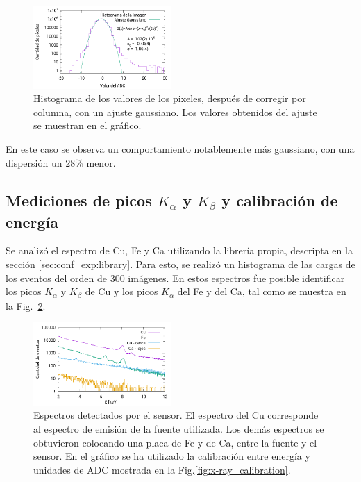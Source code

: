 \documentclass[twoside,twocolumn]{article}
\begin{document}
      \begin{figure}[h!]
        \includegraphics[width=0.47\textwidth]{figures/background_histo_subs.pdf}
        \caption{Histograma de los valores de los pixeles, después de corregir por columna,
        con un ajuste gaussiano.
        Los valores obtenidos del ajuste se muestran en el gráfico.}
        \label{fig:histogram_subs}
      \end{figure}

      En este caso se observa un comportamiento notablemente más gaussiano, con una dispersión un $28\%$ menor.

    \subsection{Mediciones de picos $K_{\alpha}$ y $K_{\beta}$ y calibración de energía}\label{sec:results:peaks}
      Se analizó el espectro de Cu, Fe y Ca utilizando la librería propia, descripta en la sección \ref{sec:conf_exp:library}.
      Para esto, se realizó un histograma de las cargas de los eventos del orden de 300 imágenes.
      En estos espectros fue posible identificar los picos $K_{\alpha}$ y $K_{\beta}$ de Cu y los picos $K_{\alpha}$ del Fe y del Ca,
      tal como se muestra en la Fig.~\ref{fig:spectrum_x-ray}.

      \begin{figure}[h!]
        \includegraphics[width=0.47\textwidth]{figures/x-ray_spectrum.pdf}
        \caption{Espectros detectados por el sensor.
          El espectro del Cu corresponde al espectro de emisión de la fuente utilizada.
          Los demás espectros se obtuvieron colocando una placa de Fe y de Ca,
          entre la fuente y el sensor.
          En el gráfico se ha utilizado la calibración entre energía y unidades de ADC mostrada en la Fig.\ref{fig:x-ray_calibration}.}
        \label{fig:spectrum_x-ray}
      \end{figure}
\end{document}
